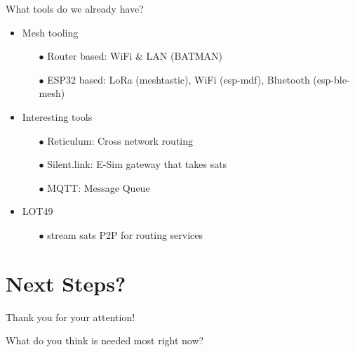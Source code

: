 \documentclass{beamer}
\newcommand{\mydiv}[4]{
  \divider{#1}{#2} (#1-rh.n) node[above] {$#3$}
  (#1-rl.n) node[right] {$#4$} (#1-out)
}
\begin{document}
\begin{frame}{What tools do we already have?}


    \begin{itemize}
    \item Mesh tooling
    \begin{itemize}
        \item[$\bullet$] Router based: WiFi & LAN (BATMAN)
        \item[$\bullet$] ESP32 based: LoRa (meshtastic), WiFi (esp-mdf), Bluetooth (esp-ble-mesh)\\
    \end{itemize}

    \item Interesting tools
    \begin{itemize}
        \item[$\bullet$] Reticulum: Cross network routing
        \item[$\bullet$] Silent.link: E-Sim gateway that takes sats
        \item[$\bullet$] MQTT: Message Queue\\
    \end{itemize}

    \item LOT49
    \begin{itemize}
        \item[$\bullet$] stream sats P2P for routing services
    \end{itemize}
    \end{itemize}

\end{frame}

\section{Next Steps?}

\begin{frame}{Thank you for your attention!}


  \centering
  \Huge What do you think is needed most right now?

\end{frame}
\end{document}
